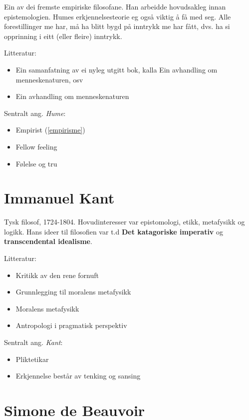 \documentclass[a4paper]{IEEEtran}
\begin{document}
Ein av dei fremste empiriske filosofane. Han arbeidde hovudsakleg innan epistemologien. Humes erkjennelsesteorie eg også viktig å få med seg. Alle forestillinger me har, må ha blitt bygd på inntrykk me har fått, dvs. ha si opprinning i eitt (eller fleire) inntrykk.
\bigskip

Litteratur:
\begin{itemize}\bigskip
    \item Ein samanfatning av ei nyleg utgitt bok, kalla Ein avhandling om menneskenaturen, osv
    \item Ein avhandling om menneskenaturen
\end{itemize}\bigskip 

Sentralt ang. \textit{Hume}:
\begin{itemize}\bigskip
    \item Empirist (\ref{empirisme})
    \item Fellow feeling
    \item Følelse og tru
\end{itemize}\bigskip


\section{Immanuel Kant}
\label{kant}\bigskip

Tysk filosof, 1724-1804. Hovudinteresser var epistomologi, etikk, metafysikk og logikk. Hans ideer til filosofien var t.d \textbf{Det katagoriske imperativ} og \textbf{transcendental idealisme}.\bigskip

Litteratur:
\begin{itemize}
    \item Kritikk av den rene fornuft
    \item Grunnlegging til moralens metafysikk
    \item Moralens metafysikk
    \item Antropologi i pragmatisk perspektiv
\end{itemize}\bigskip 

Sentralt ang. \textit{Kant}:
\begin{itemize}\bigskip
    \item Pliktetikar
    \item Erkjennelse består av tenking og sansing
\end{itemize}\bigskip

\section{Simone de Beauvoir}
\label{beauvoir}\bigskip
\end{document}
